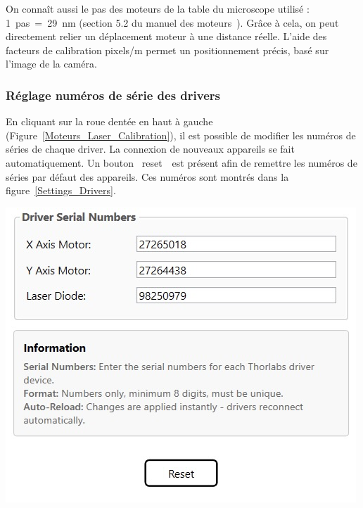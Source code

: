 On connaît aussi le pas des moteurs de la table du microscope utilisé : 1~pas~=~29~nm (section 5.2 du manuel des moteurs~\cite{motorZ812B}). Grâce à cela, on peut directement relier un déplacement moteur à une distance réelle. L'aide des facteurs de calibration pixels/\textmu m permet un positionnement précis, basé sur l'image de la caméra.

\subsubsection{Réglage numéros de série des drivers}

\begin{minipage}[c]{0.4\textwidth}
    En cliquant sur la roue dentée en haut à gauche (Figure~\ref{Moteurs_Laser_Calibration}), il est possible de modifier les numéros de séries de chaque driver. La connexion de nouveaux appareils se fait automatiquement. Un bouton \guillemotleft~reset~\guillemotright ~est présent afin de remettre les numéros de séries par défaut des appareils. Ces numéros sont montrés dans la figure~\ref{Settings_Drivers}.
\end{minipage}
\begin{minipage}[c]{0.58\textwidth}
    \begin{center}
        \includegraphics[width=\textwidth]{assets/figures/Application_ServoVision/Settings_Drivers.png}
    \end{center}
    \label{Settings_Drivers}
\end{minipage}

